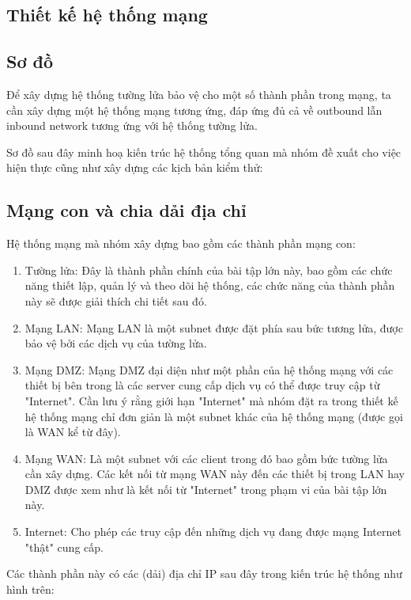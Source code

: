 \documentclass[12pt,titlepage,a4paper]{article}
\begin{document}
	\subsection{Thiết kế hệ thống mạng}
	\subsection{Sơ đồ}
	Để xây dựng hệ thống tường lửa bảo vệ cho một số thành phần trong mạng, ta cần xây dựng một hệ thống mạng tương ứng, đáp ứng đủ cả về outbound lẫn inbound network tương ứng với hệ thống tường lửa.
	\par
	Sơ đồ sau đây minh hoạ kiến trúc hệ thống tổng quan mà nhóm đề xuất cho việc hiện thực cũng như xây dựng các kịch bản kiểm thử:
	
	
	\subsection{Mạng con và chia dải địa chỉ}
	Hệ thống mạng mà nhóm xây dựng bao gồm các thành phần mạng con:
	\begin{enumerate}
		\item Tường lửa: Đây là thành phần chính của bài tập lớn này, bao gồm các chức năng thiết lập, quản lý và theo dõi hệ thống, các chức năng của thành phần này sẽ được giải thích chi tiết sau đó.
		\item Mạng LAN: Mạng LAN là một subnet được đặt phía sau bức tương lửa, được bảo vệ bởi các dịch vụ của tường lửa.
		\item Mạng DMZ: Mạng DMZ đại diện như một phần của hệ thống mạng với các thiết bị bên trong là các server cung cấp dịch vụ có thể được truy cập từ "Internet". Cần lưu ý rằng giới hạn "Internet" mà nhóm đặt ra trong thiết kế hệ thống mạng chỉ đơn giản là một subnet khác của hệ thống mạng (được gọi là WAN kể từ đây).
		\item Mạng WAN: Là một subnet với các client trong đó bao gồm bức tường lửa cần xây dựng. Các kết nối từ mạng WAN này đến các thiết bị trong LAN hay DMZ được xem như là kết nối từ "Internet" trong phạm vi của bài tập lớn này.
		\item Internet: Cho phép các truy cập đến những dịch vụ đang được mạng Internet "thật" cung cấp.
	\end{enumerate}
	Các thành phần này có các (dải) địa chỉ IP sau đây trong kiến trúc hệ thống như hình trên:
\end{document}
